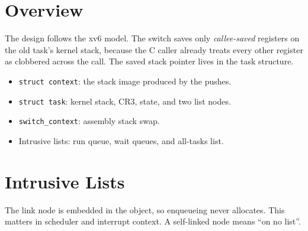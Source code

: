 % 

\newcommand{\code}[1]{\texttt{#1}}

\section{Overview}
The design follows the xv6 model. The switch saves only
\emph{callee-saved} registers on the old task's kernel stack, because the
C caller already treats every other register as clobbered across the call.
The saved stack pointer lives in the task structure.

\begin{itemize}
  \item \code{struct context}: the stack image produced by the pushes.
  \item \code{struct task}: kernel stack, CR3, state, and two list nodes.
  \item \code{switch\_context}: assembly stack swap.
  \item Intrusive lists: run queue, wait queues, and all-tasks list.
\end{itemize}

\section{Intrusive Lists}
The link node is embedded in the object, so enqueueing never allocates.
This matters in scheduler and interrupt context. A self-linked node means
``on no list''.

